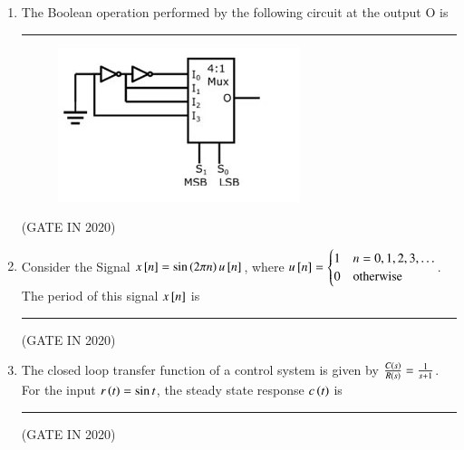 \documentclass[journal,12pt,onecolumn]{IEEEtran}
\theoremstyle{remark}
\begin{document}
\begin{enumerate}
\item The Boolean operation performed by the following circuit at the output O is \rule{2cm}{0.4pt}
\begin{figure}[H]
\centering
\includegraphics[width=0.4\columnwidth]{figs/q9.jpg}
\caption*{}
\label{fig:q9}
\end{figure}

\hfill{(GATE IN 2020)}
\begin{enumerate}
\end{enumerate}

\item Consider the Signal $x{}\left[n\right] = \sin\left(2\pi n\right) u{}\left[n\right]$, where $u{}\left[n\right] = \begin{cases} 1 & n = 0,1,2,3, \dots \\ 0 & \text{otherwise} \end{cases}$. The period of this signal $x{}\left[n\right]$ is \rule{2cm}{0.4pt}

\hfill{(GATE IN 2020)}
\begin{enumerate}
\end{enumerate}

\item The closed loop transfer function of a control system is given by $\frac{C\left(s\right)}{R\left(s\right)} = \frac{1}{s+1}$. For the input $r\left(t\right) = \sin t$, the steady state response $c\left(t\right)$ is \rule{2cm}{0.4pt}

\hfill{(GATE IN 2020)}
\begin{enumerate}
\end{enumerate}


\end{enumerate}
\end{document}
